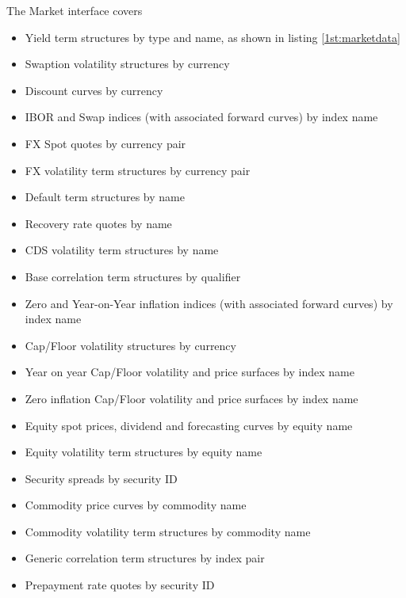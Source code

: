\documentclass[12pt, a4paper]{article}
\begin{document}
The Market interface covers
\begin{itemize}
\item Yield term structures by type and name, as shown in listing \ref{1st:marketdata}
\item Swaption volatility structures by currency
\item Discount curves by currency
\item IBOR and Swap indices (with associated forward curves) by index name
\item FX Spot quotes by currency pair
\item FX volatility term structures by currency pair
\item Default term structures by name
\item Recovery rate quotes by name
\item CDS volatility term structures by name
\item Base correlation term structures by qualifier
\item Zero and Year-on-Year inflation indices (with associated forward curves) by index name
\item Cap/Floor volatility structures by currency
\item Year on year Cap/Floor volatility and price surfaces by index name
\item Zero inflation Cap/Floor volatility and price surfaces by index name
\item Equity spot prices, dividend and forecasting curves by equity name
\item Equity volatility term structures by equity name
\item Security spreads by security ID
\item Commodity price curves by commodity name
\item Commodity volatility term structures by commodity name
\item Generic correlation term structures by index pair
\item Prepayment rate quotes by security ID
\end{itemize}
\end{document}
